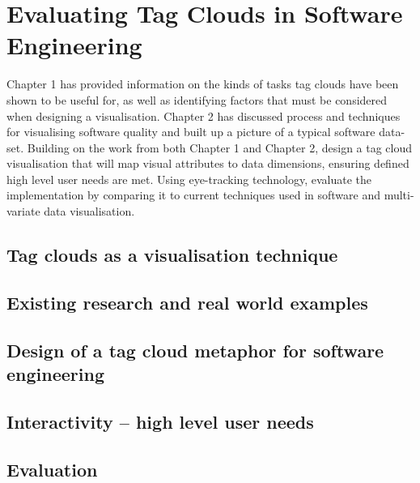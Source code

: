 \chapter{Evaluating Tag Clouds in Software Engineering}
\ifpdf
    \graphicspath{{Chapter4/Chapter4Figs/PNG/}{Chapter4/Chapter4Figs/PDF/}{Chapter4/Chapter4Figs/}}
\else
    \graphicspath{{Chapter4/Chapter4Figs/EPS/}{Chapter4/Chapter4Figs/}}
\fi

Chapter 1 has provided information on the kinds of tasks tag clouds have been shown to be useful for, as well as identifying factors that must be considered when designing a visualisation. Chapter 2 has discussed process and techniques for visualising software quality and built up a picture of a typical software data-set. Building on the work from both Chapter 1 and Chapter 2, design a tag cloud visualisation that will map visual attributes to data dimensions, ensuring defined high level user needs are met. Using eye-tracking technology, evaluate the implementation by comparing it to current techniques used in software and multi-variate data visualisation.  

\section{Tag clouds as a visualisation technique}


\section{Existing research and real world examples}


\section{Design of a tag cloud metaphor for software engineering}


\section{Interactivity – high level user needs}


\section{Evaluation}





